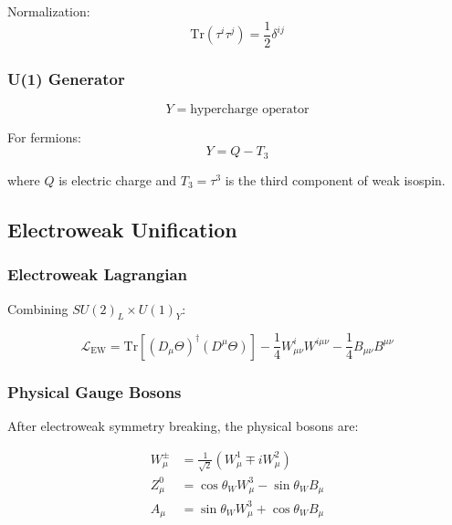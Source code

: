 Normalization:
\begin{equation}
\text{Tr}(\tau^i \tau^j) = \frac{1}{2}\delta^{ij}
\end{equation}

\subsubsection{U(1) Generator}

\begin{equation}
Y = \text{hypercharge operator}
\end{equation}

For fermions:
\begin{equation}
Y = Q - T_3
\end{equation}

where $Q$ is electric charge and $T_3 = \tau^3$ is the third component of weak isospin.

\subsection{Electroweak Unification}

\subsubsection{Electroweak Lagrangian}

Combining $SU(2)_L \times U(1)_Y$:

\begin{equation}
\label{eq:canonical:ew_lagrangian}
\mathcal{L}_{\text{EW}} = \text{Tr}\left[(D_\mu\Theta)^\dagger (D^\mu\Theta)\right] - \frac{1}{4}W^i_{\mu\nu}W^{i\mu\nu} - \frac{1}{4}B_{\mu\nu}B^{\mu\nu}
\end{equation}

\subsubsection{Physical Gauge Bosons}

After electroweak symmetry breaking, the physical bosons are:

\begin{align}
W^\pm_\mu &= \frac{1}{\sqrt{2}}(W^1_\mu \mp i W^2_\mu) \label{eq:canonical:W_bosons} \\
Z^0_\mu &= \cos\theta_W W^3_\mu - \sin\theta_W B_\mu \label{eq:canonical:Z_boson} \\
A_\mu &= \sin\theta_W W^3_\mu + \cos\theta_W B_\mu \label{eq:canonical:photon}
\end{align}

